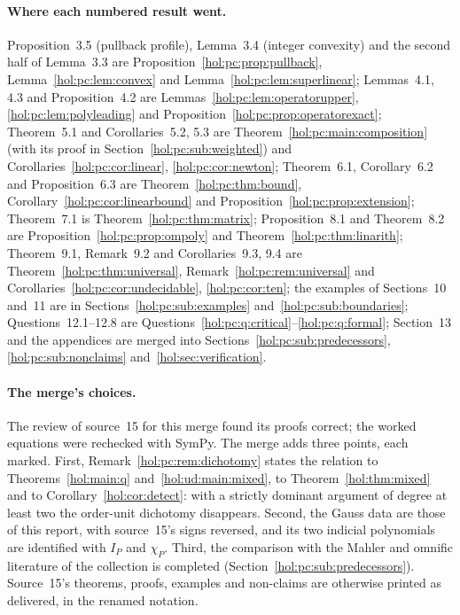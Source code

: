 \documentclass[11pt]{article}
\numberwithin{equation}{section}
\theoremstyle{definition}
\theoremstyle{remark}
\begin{document}
\paragraph{Where each numbered result went.}
Proposition~3.5 (pullback profile), Lemma~3.4 (integer convexity) and the
second half of Lemma~3.3 are Proposition~\ref{hol:pc:prop:pullback},
Lemma~\ref{hol:pc:lem:convex} and Lemma~\ref{hol:pc:lem:superlinear};
Lemmas~4.1, 4.3 and Proposition~4.2 are Lemmas~\ref{hol:pc:lem:operatorupper},
\ref{hol:pc:lem:polyleading} and Proposition~\ref{hol:pc:prop:operatorexact};
Theorem~5.1 and Corollaries~5.2, 5.3 are
Theorem~\ref{hol:pc:main:composition} (with its proof in
Section~\ref{hol:pc:sub:weighted}) and Corollaries~\ref{hol:pc:cor:linear},
\ref{hol:pc:cor:newton}; Theorem~6.1, Corollary~6.2 and Proposition~6.3 are
Theorem~\ref{hol:pc:thm:bound}, Corollary~\ref{hol:pc:cor:linearbound} and
Proposition~\ref{hol:pc:prop:extension}; Theorem~7.1 is
Theorem~\ref{hol:pc:thm:matrix}; Proposition~8.1 and Theorem~8.2 are
Proposition~\ref{hol:pc:prop:ompoly} and Theorem~\ref{hol:pc:thm:linarith};
Theorem~9.1, Remark~9.2 and Corollaries~9.3, 9.4 are
Theorem~\ref{hol:pc:thm:universal}, Remark~\ref{hol:pc:rem:universal} and
Corollaries~\ref{hol:pc:cor:undecidable}, \ref{hol:pc:cor:ten}; the examples
of Sections~10 and~11 are in Sections~\ref{hol:pc:sub:examples}
and~\ref{hol:pc:sub:boundaries}; Questions~12.1--12.8 are
Questions~\ref{hol:pc:q:critical}--\ref{hol:pc:q:formal}; Section~13 and the
appendices are merged into Sections~\ref{hol:pc:sub:predecessors},
\ref{hol:pc:sub:nonclaims} and~\ref{hol:sec:verification}.

\paragraph{The merge's choices.}
The review of source~15 for this merge found its proofs correct; the worked
equations were rechecked with SymPy. The merge adds three points, each marked.
First, Remark~\ref{hol:pc:rem:dichotomy} states the relation to
Theorems~\ref{hol:main:q} and~\ref{hol:ud:main:mixed}, to
Theorem~\ref{hol:thm:mixed} and to Corollary~\ref{hol:cor:detect}: with a
strictly dominant argument of degree at least two the order-unit dichotomy
disappears. Second, the Gauss data are those of this report, with source~15's
signs reversed, and its two indicial polynomials are identified with $I_P$ and
$\chi_P$. Third, the comparison with the Mahler and omnific literature of the
collection is completed (Section~\ref{hol:pc:sub:predecessors}). Source~15's
theorems, proofs, examples and non-claims are otherwise printed as delivered,
in the renamed notation.
\end{document}
